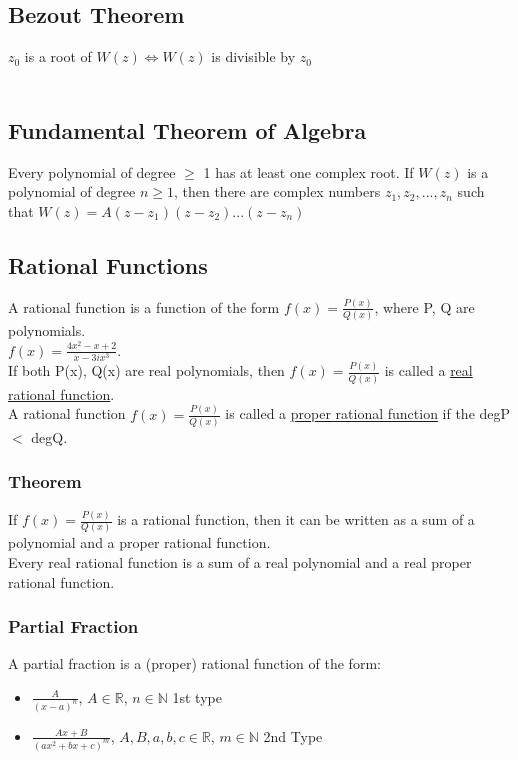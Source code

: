 \documentclass{report}
\begin{document}
\subsection{Bezout Theorem}
$z_0$ is a root of $W(z)\Leftrightarrow W(z)$  is divisible by $z_0$ \\ \\
\subsection{Fundamental Theorem of Algebra}
Every polynomial of degree $\geq$ 1 has at least one complex root. If $W(z)$ is a polynomial of degree $n\geq 1$, then there are complex numbers $z_1, z_2, ..., z_n$ such that $W(z) = A(z-z_1)(z-z_2) ... (z-z_n)$



\subsection{Rational Functions}
A rational function is a function of the form $f(x) = \frac{P(x)}{Q(x)}$, where P, Q are polynomials. \\
$f(x) = \frac{4x^2 - x + 2}{x-3ix^3}$.\\
If both P(x), Q(x) are real polynomials, then $f(x) = \frac{P(x)}{Q(x)}$ is called a \underline{real rational function}.\\
A rational function $f(x) = \frac{P(x)}{Q(x)}$ is called a \underline{proper rational function} if the degP $<$ degQ.\\

\subsubsection{Theorem}
If $f(x) = \frac{P(x)}{Q(x)}$ is a rational function, then it can be written as a sum of a polynomial and a proper rational function. \\
Every real rational function is a sum of a real polynomial and a real proper rational function.



\subsubsection{Partial Fraction}
A partial fraction is a (proper) rational function of the form:
\Large
\begin{itemize}
	\item $\frac{A}{(x-a)^n}$, $A\in\mathbb{R}$, $n\in\mathbb{N}$ 1st type
	\item $\frac{Ax + B}{(ax^2 + bx  + c)^m}$, $A,B,a,b,c\in\mathbb{R}$, $m\in\mathbb{N}$ 2nd Type
\end{itemize}
\large
\end{document}
